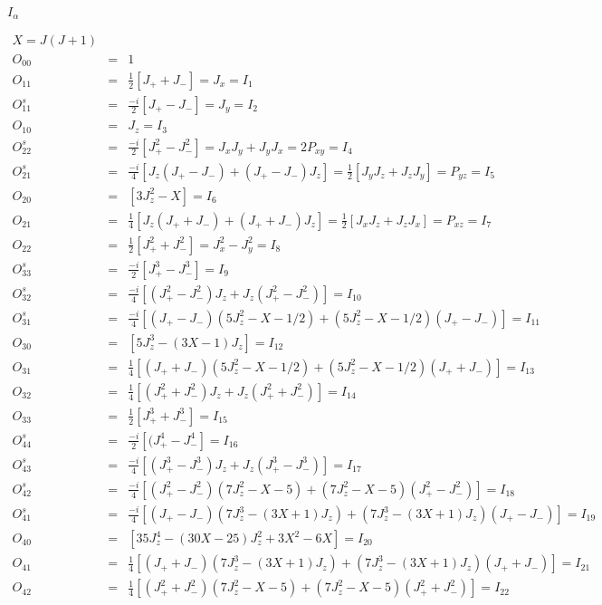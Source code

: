 \documentclass[twoside]{article}
\def\lthtmlcheckvsize{\ifdim\ht\sizebox<\vsize 
  \ifdim\wd\sizebox<\hsize\expandafter\hfill\fi \expandafter\vfill
  \else\expandafter\vss\fi}%
\begin{document}
{\newpage\clearpage
{}%
$I_{\alpha}$%
\lthtmlindisplaymathZ
\lthtmlcheckvsize\clearpage}

{\newpage\clearpage
{}%
\begin{eqnarray*}
X=J(J+1)\\
O_{00}&=&1\\
\hline
O_{11}&=&\frac{1}{2}[J_++J_-]=J_x=I_1 \\
O^s_{11}&=&\frac{-i}{2}[J_+-J_-]=J_y=I_2 \\
O_{10}&=&J_z=I_3 \\
\hline
O^s_{22}&=&\frac{-i}{2}[J_+^2-J_-^2]=J_xJ_y+J_yJ_x=2P_{xy}=I_4 \\
O^s_{21}&=&\frac{-i}{4}[J_z(J_+-J_-)+(J_+-J_-)J_z]=\frac{1}{2}[J_yJ_z+J_zJ_y]=P_{yz}=I_5 \\
O_{20}&=&[3J_z^2-X]=I_6 \\
O_{21}&=&\frac{1}{4}[J_z(J_++J_-)+(J_++J_-)J_z]=\frac{1}{2}[J_xJ_z+J_zJ_x]=P_{xz}=I_7 \\
O_{22}&=&\frac{1}{2}[J_+^2+J_-^2]=J_x^2-J_y^2 =I_8\\
\hline
O^s_{33}&=&\frac{-i}{2}[J_+^3-J_-^3]=I_9 \\
O^s_{32}&=&\frac{-i}{4}[(J_+^2-J_-^2)J_z+J_z(J_+^2-J_-^2)]=I_{10} \\
O^s_{31}&=&\frac{-i}{4}[(J_+-J_-)(5J_z^2-X-1/2)+(5J_z^2-X-1/2)(J_+-J_-)]=I_{11} \\
O_{30}&=&[5J_z^3-(3X-1)J_z]=I_{12} \\
O_{31}&=&\frac{1}{4}[(J_++J_-)(5J_z^2-X-1/2)+(5J_z^2-X-1/2)(J_++J_-)] =I_{13}\\
O_{32}&=&\frac{1}{4}[(J_+^2+J_-^2)J_z+J_z(J_+^2+J_-^2)]=I_{14} \\
O_{33}&=&\frac{1}{2}[J_+^3+J_-^3]=I_{15} \\
\hline
O^s_{44}&=&\frac{-i}{2}[(J_+^4-J_-^4]=I_{16}\\
O^s_{43}&=&\frac{-i}{4}[(J_+^3-J_-^3)J_z+J_z(J_+^3-J_-^3)] =I_{17}\\
O^s_{42}&=&\frac{-i}{4}[(J_+^2-J_-^2)(7J_z^2-X-5)+(7J_z^2-X-5)(J_+^2-J_-^2)]=I_{18} \\
O^s_{41}&=&\frac{-i}{4}[(J_+-J_-)(7J_z^3-(3X+1)J_z)+(7J_z^3-(3X+1)J_z)(J_+-J_-)]=I_{19} \\
O_{40}&=&[35J_z^4-(30X-25)J_z^2+3X^2-6X]=I_{20} \\
O_{41}&=&\frac{1}{4}[(J_++J_-)(7J_z^3-(3X+1)J_z)+(7J_z^3-(3X+1)J_z)(J_++J_-)]=I_{21} \\
O_{42}&=&\frac{1}{4}[(J_+^2+J_-^2)(7J_z^2-X-5)+(7J_z^2-X-5)(J_+^2+J_-^2)] =I_{22}\\

\end{eqnarray*}}
\end{document}
